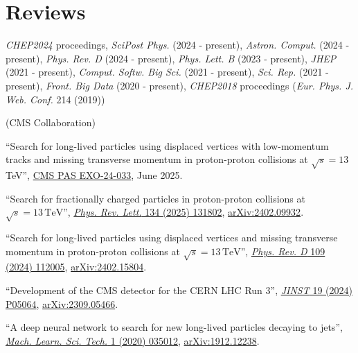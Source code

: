 \section{Reviews}
\begin{description}[leftmargin=12pt,font=\normalfont\textit]
\item[Journal referee:]
\begin{description}[leftmargin=12pt,font=\normalfont,labelsep=0em]\item[]
\item \emph{CHEP2024} proceedings, \emph{SciPost Phys.} (2024 - present), \emph{Astron. Comput.} (2024 - present), \emph{Phys. Rev. D} (2024 - present), \emph{Phys. Lett. B} (2023 - present), \emph{JHEP} (2021 - present), \emph{Comput. Softw. Big Sci.} (2021 - present), \emph{Sci. Rep.} (2021 - present), \emph{Front. Big Data} (2020 - present), \emph{CHEP2018} proceedings (\emph{Eur. Phys. J. Web. Conf.} 214 (2019))
\end{description}
\item[Analysis Review Committee (ARC) member:] (CMS Collaboration)
\begin{description}[leftmargin=12pt,font=\normalfont,labelsep=0em]
\item ``Search for long-lived particles using displaced vertices with low-momentum tracks and missing transverse momentum in proton-proton collisions at $\sqrt{s}=13$ TeV'', \href{http://cds.cern.ch/record/2937026}{CMS PAS EXO-24-033}, June 2025.
\item ``Search for fractionally charged particles in proton-proton collisions at $\sqrt{s} = 13\,\text{TeV}$'', \href{http://dx.doi.org/10.1103/PhysRevLett.134.131802}{\emph{Phys. Rev. Lett.} 134 (2025) 131802}, \href{https://arxiv.org/abs/2402.09932}{arXiv:2402.09932}.
\item ``Search for long-lived particles using displaced vertices and missing transverse momentum in proton-proton collisions at $\sqrt{s} = 13\,\text{TeV}$'', \href{http://dx.doi.org/10.1103/PhysRevD.109.112005}{\emph{Phys. Rev. D} 109 (2024) 112005}, \href{https://arxiv.org/abs/2402.15804}{arXiv:2402.15804}.
\item ``Development of the CMS detector for the CERN LHC Run 3'', \href{https://doi.org/10.1088/1748-0221/19/05/P05064}{\emph{JINST} 19 (2024) P05064}, \href{https://arxiv.org/abs/2309.05466}{arXiv:2309.05466}.
\item ``A deep neural network to search for new long-lived particles decaying to jets'', \href{https://doi.org/10.1088/2632-2153/ab9023}{\emph{Mach. Learn. Sci. Tech.} 1 (2020) 035012}, \href{https://arxiv.org/abs/1912.12238}{arXiv:1912.12238}.

\end{description}
\end{description}
